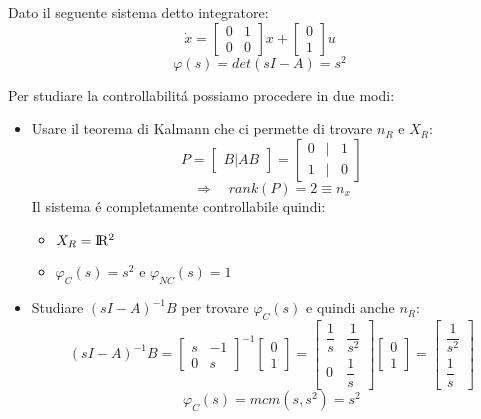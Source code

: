 \documentclass[../main.tex]{subfiles}
\begin{document}
		\begin{mdframed}[style=Exercise]
			\begin{Exercise}[title={Calcolare $ X_R $ e $ \varphi_C(s) $}, difficulty=1]
				Dato il seguente sistema detto integratore:
				\[ 
					\dot x =
					\begin{bmatrix}
						0 & 1\\
						0 & 0
					\end{bmatrix} x +
					\begin{bmatrix}
						0\\
						1
					\end{bmatrix} u
				\]
				\[
					\varphi(s) = det\left( sI-A \right) = s^2
				\]
				
				Per studiare la controllabilit\'a possiamo procedere in due modi:
				\begin{itemize}
					\item
						Usare il teorema di Kalmann che ci permette di trovare $ n_R $ e $ X_R $:
						\[
							P =
							\begin{bmatrix}
								B | AB
							\end{bmatrix} =
							\begin{bmatrix}
								0 & | & 1\\
								1 & | & 0
							\end{bmatrix}
						\]
						\[
							\Rightarrow\quad rank\left( P \right) = 2 \equiv n_x
						\]
						Il sistema \'e completamente controllabile quindi: 
						\begin{itemize}
							\item 
								$ X_R = \rm I\!R^2 $
							\item
								$ \varphi_C(s) = s^2 $ e $ \varphi_{NC}(s) = 1 $
						\end{itemize}
					\item
						Studiare $ (sI-A)^{-1}B $ per trovare $ \varphi_C(s) $ e quindi anche $ n_R $:
						\[
							(sI-A)^{-1}B =
							\begin{bmatrix}
								s & -1\\
								0 & s
							\end{bmatrix}^{-1}
							\begin{bmatrix}
								0\\
								1
							\end{bmatrix}=
							\begin{bmatrix}
								\dfrac{1}{s} & \dfrac{1}{s^2}
								\\[1em]
								0 & \dfrac{1}{s}
							\end{bmatrix}
							\begin{bmatrix}
								0\\
								1
							\end{bmatrix} =
							\begin{bmatrix}
								\dfrac{1}{s^2}
								\\[1em]
								\dfrac{1}{s}
							\end{bmatrix}	
						\]
						\[
							\varphi_C(s) = mcm\left( s, s^2 \right) = s^2
						\]
						

\end{itemize}
\end{Exercise}
\end{mdframed}
\end{document}
